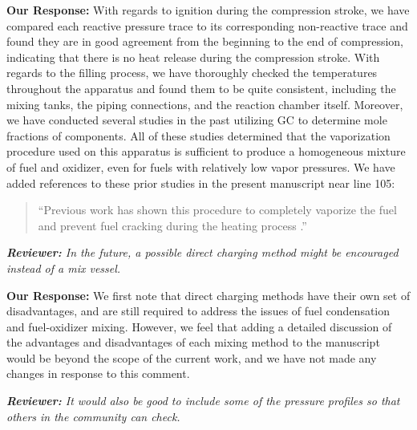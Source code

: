 \documentclass{article}
\newenvironment{reviewer}{\vspace{0.5\baselineskip}\begingroup\itshape\textbf{Reviewer:}}{\endgroup\vspace{0.5\baselineskip}}
\newenvironment{response}{\vspace{0.5\baselineskip}\textbf{Our Response:}}{\vspace{0.5\baselineskip}}
\begin{document}
\begin{response}
    With regards to ignition during the compression stroke, we have compared each reactive pressure
    trace to its corresponding non-reactive trace and found they are in good agreement from the
    beginning to the end of compression, indicating that there is no heat release during the
    compression stroke. With regards to the filling process, we have thoroughly checked the
    temperatures throughout the apparatus and found them to be quite consistent, including the
    mixing tanks, the piping connections, and the reaction chamber itself. Moreover, we have
    conducted several studies in the past utilizing GC to determine mole fractions of components.
    All of these studies determined that the vaporization procedure used on this apparatus is
    sufficient to produce a homogeneous mixture of fuel and oxidizer, even for fuels with relatively
    low vapor pressures. We have added references to these prior studies in the present manuscript
    near line 105:

    \begin{quote}
        ``Previous work has shown this procedure to completely vaporize the fuel and prevent fuel
        cracking during the heating process \cite{Weber2011a,Kumar2009,Das2012}.''
    \end{quote}
\end{response}

\begin{reviewer}
    In the future, a possible direct charging method might be encouraged instead of a mix vessel.
\end{reviewer}

\begin{response}
    We first note that direct charging methods have their own set of disadvantages, and are still
    required to address the issues of fuel condensation and fuel-oxidizer mixing. However, we feel
    that adding a detailed discussion of the advantages and disadvantages of each mixing method to
    the manuscript would be beyond the scope of the current work, and we have not made any changes
    in response to this comment.
\end{response}

\begin{reviewer}
    It would also be good to include some of the pressure profiles so that others in the community
    can check.
\end{reviewer}
\end{document}
